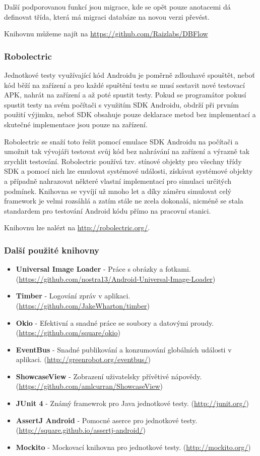 \documentclass[czech,master,public,dept460,male,java,cpdeclaration]{diploma}
\begin{document}
  Další podporovanou funkcí jsou migrace, kde se opět pouze anotacemi dá definovat třída,
  která má migraci databáze na novou verzi převést.

  Knihovnu můžeme najít na \url{https://github.com/Raizlabs/DBFlow}


\subsubsection{Robolectric}\label{robolectric}
Jednotkové testy využívající kód Androidu je poměrně zdlouhavé spouštět, neboť kód běží na
zařízení a pro každé spuštění testu se musí sestavit nové testovací APK, nahrát na zařízení
a až poté spustit testy. Pokud se programátor pokusí spustit testy na svém počítači s využitím
SDK Androidu, obdrží při prvním použití výjimku, neboť SDK obsahuje pouze deklarace metod
bez implementací a skutečné implementace jsou pouze na zařízení.

Robolectric se snaží toto řešit pomocí emulace SDK Androidu na počítači a umožnit tak vývojáři
testovat svůj kód bez nahrávání na zařízení a výrazně tak zrychlit testování. Robolectric
používá tzv. stínové objekty pro všechny třídy SDK a pomocí nich lze emulovat systémové události,
získávat systémové objekty a případně nahrazovat některé vlastní implementací pro simulaci
určitých podmínek. Knihovna se vyvíjí už mnoho let a díky záměru simulovat celý framework je velmi
rozsáhlá a zatím stále ne zcela dokonalá, nicméně se stala standardem pro testování Android kódu
přímo na pracovní stanici.

Knihovnu lze nalézt na \url{http://robolectric.org/}.

\subsubsection{Další použité knihovny}
\begin{itemize}
  \item \textbf{Universal Image Loader} - Práce s obrázky a fotkami. (\url{https://github.com/nostra13/Android-Universal-Image-Loader})
  \item \textbf{Timber} - Logování zpráv v aplikaci. (\url{https://github.com/JakeWharton/timber})
  \item \textbf{Okio} - Efektivní a snadné práce se soubory a datovými proudy. (\url{https://github.com/square/okio})
  \item \textbf{EventBus} - Snadné publikování a konzumování globálních události v aplikaci. (\url{http://greenrobot.org/eventbus/})
  \item \textbf{ShowcaseView} - Zobrazení uživatelsky přívětivé nápovědy. (\url{https://github.com/amlcurran/ShowcaseView})
  \item \textbf{JUnit 4} - Známý framewrok pro Java jednotkové testy. (\url{http://junit.org/})
  \item \textbf{AssertJ Android} - Pomocné aserce pro jednotkové testy. (\url{http://square.github.io/assertj-android/})
  \item \textbf{Mockito} - Mockovací knihovna pro jednotkové testy. (\url{http://mockito.org/})


\end{itemize}
\end{document}
